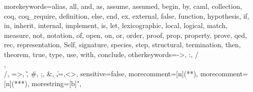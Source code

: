 \usepackage{fullpage}
\usepackage{listings}
\usepackage{times}   %
\usepackage{changepage}

\newcommand{\ocaml}{{\sf OCaml}}
\newcommand{\focal}{{\sf Fo\-Ca\-Li\-ze}}
\newcommand{\focalizec}{{\sf focalizec}}
\newcommand{\zenon}{{\sf Zenon}}
\newcommand{\coq}{{\sf Coq}}

  {morekeywords={alias, all, and, as, assume, assumed, begin, by, caml,
      collection, coq, coq_require, definition, else, end,
      ex, external, false, function, hypothesis, if, in,
      inherit, internal, implement, is, let, lexicographic,
      local, logical, match, measure, not, notation, of, open,
      on, or, order, proof, prop, property, prove, qed, rec,
      representation, Self, signature, species, step,
      structural, termination, then, theorem, true, type, use,
      with, conclude},
    otherkeywords={->, :, /\\, \\/, =>, \~, \#, ;, \&, \|,=,<>},
    sensitive=false,
    morecomment=[n]{(*}{*)},  %
    morecomment=[n]{(**}{*)}, %
    morestring=[b]",
  }

\newcommand{\setlangfocalize}{
\lstset{
  language=FoCaLiZe, tabsize=2, frame=none, breaklines=true,
  basicstyle=\ttfamily, xleftmargin=1mm
}
}
\setlangfocalize

